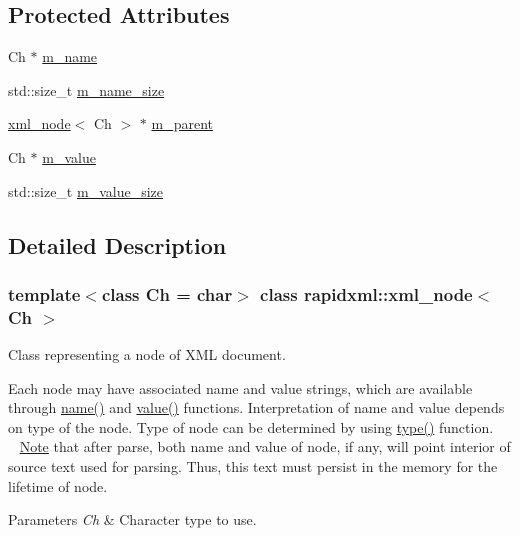 \subsection*{Protected Attributes}
\begin{DoxyCompactItemize}
\item 
Ch $\ast$ \mbox{\hyperlink{classrapidxml_1_1xml__base_a23053aafada985ece680d52694c63cdc}{m\+\_\+name}}
\item 
std\+::size\+\_\+t \mbox{\hyperlink{classrapidxml_1_1xml__base_af67d7df13abd2eb30036a801b87d6f81}{m\+\_\+name\+\_\+size}}
\item 
\mbox{\hyperlink{classrapidxml_1_1xml__node}{xml\+\_\+node}}$<$ Ch $>$ $\ast$ \mbox{\hyperlink{classrapidxml_1_1xml__base_a1b2fdbb90cc0cc9135a8311c40d79bf9}{m\+\_\+parent}}
\item 
Ch $\ast$ \mbox{\hyperlink{classrapidxml_1_1xml__base_a8fbc9ba6b320f64f4bdab09469a9e623}{m\+\_\+value}}
\item 
std\+::size\+\_\+t \mbox{\hyperlink{classrapidxml_1_1xml__base_a643295fc68623ed58e2db3551d44fef0}{m\+\_\+value\+\_\+size}}
\end{DoxyCompactItemize}


\subsection{Detailed Description}
\subsubsection*{template$<$class Ch = char$>$\newline
class rapidxml\+::xml\+\_\+node$<$ Ch $>$}

Class representing a node of X\+ML document. 

Each node may have associated name and value strings, which are available through \mbox{\hyperlink{classrapidxml_1_1xml__base_af8436e9ee14c127220113eaa956eafee}{name()}} and \mbox{\hyperlink{classrapidxml_1_1xml__base_a558b1045e6751e4024309d41bf35c542}{value()}} functions. Interpretation of name and value depends on type of the node. Type of node can be determined by using \mbox{\hyperlink{classrapidxml_1_1xml__node_a026a603e420a2e3e7ab820cfbd1a7e97}{type()}} function. ~\newline
~\newline
 \mbox{\hyperlink{classNote}{Note}} that after parse, both name and value of node, if any, will point interior of source text used for parsing. Thus, this text must persist in the memory for the lifetime of node. 
\begin{DoxyParams}{Parameters}
{\em Ch} & Character type to use. \\
\hline
\end{DoxyParams}


